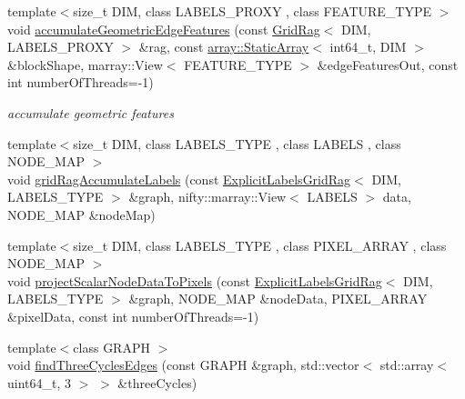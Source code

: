 \begin{DoxyCompactItemize}
\item 
{\footnotesize template$<$size\+\_\+t D\+I\+M, class L\+A\+B\+E\+L\+S\+\_\+\+P\+R\+O\+X\+Y , class F\+E\+A\+T\+U\+R\+E\+\_\+\+T\+Y\+P\+E $>$ }\\void \hyperlink{namespacenifty_1_1graph_a152a70f798b787b7fe72acfa1927e098}{accumulate\+Geometric\+Edge\+Features} (const \hyperlink{classnifty_1_1graph_1_1GridRag}{Grid\+Rag}$<$ D\+I\+M, L\+A\+B\+E\+L\+S\+\_\+\+P\+R\+O\+X\+Y $>$ \&rag, const \hyperlink{namespacenifty_1_1array_a683f151f19c851754e0c6d55ed16a0c2}{array\+::\+Static\+Array}$<$ int64\+\_\+t, D\+I\+M $>$ \&block\+Shape, marray\+::\+View$<$ F\+E\+A\+T\+U\+R\+E\+\_\+\+T\+Y\+P\+E $>$ \&edge\+Features\+Out, const int number\+Of\+Threads=-\/1)
\begin{DoxyCompactList}\small\item\em accumulate geometric features \end{DoxyCompactList}\item 
{\footnotesize template$<$size\+\_\+t D\+I\+M, class L\+A\+B\+E\+L\+S\+\_\+\+T\+Y\+P\+E , class L\+A\+B\+E\+L\+S , class N\+O\+D\+E\+\_\+\+M\+A\+P $>$ }\\void \hyperlink{namespacenifty_1_1graph_a079406a55f43b7ea55616943a3bc6fff}{grid\+Rag\+Accumulate\+Labels} (const \hyperlink{namespacenifty_1_1graph_a45cca2dcd061996d13ec8e6bb8afb200}{Explicit\+Labels\+Grid\+Rag}$<$ D\+I\+M, L\+A\+B\+E\+L\+S\+\_\+\+T\+Y\+P\+E $>$ \&graph, nifty\+::marray\+::\+View$<$ L\+A\+B\+E\+L\+S $>$ data, N\+O\+D\+E\+\_\+\+M\+A\+P \&node\+Map)
\item 
{\footnotesize template$<$size\+\_\+t D\+I\+M, class L\+A\+B\+E\+L\+S\+\_\+\+T\+Y\+P\+E , class P\+I\+X\+E\+L\+\_\+\+A\+R\+R\+A\+Y , class N\+O\+D\+E\+\_\+\+M\+A\+P $>$ }\\void \hyperlink{namespacenifty_1_1graph_a6b3a3f0cacf4a06ba0b45afc3fb9bc08}{project\+Scalar\+Node\+Data\+To\+Pixels} (const \hyperlink{namespacenifty_1_1graph_a45cca2dcd061996d13ec8e6bb8afb200}{Explicit\+Labels\+Grid\+Rag}$<$ D\+I\+M, L\+A\+B\+E\+L\+S\+\_\+\+T\+Y\+P\+E $>$ \&graph, N\+O\+D\+E\+\_\+\+M\+A\+P \&node\+Data, P\+I\+X\+E\+L\+\_\+\+A\+R\+R\+A\+Y \&pixel\+Data, const int number\+Of\+Threads=-\/1)
\item 
{\footnotesize template$<$class G\+R\+A\+P\+H $>$ }\\void \hyperlink{namespacenifty_1_1graph_a2ae7ba3bc963090781fd1cafd70ac800}{find\+Three\+Cycles\+Edges} (const G\+R\+A\+P\+H \&graph, std\+::vector$<$ std\+::array$<$ uint64\+\_\+t, 3 $>$ $>$ \&three\+Cycles)
\item 

\end{DoxyCompactItemize}
